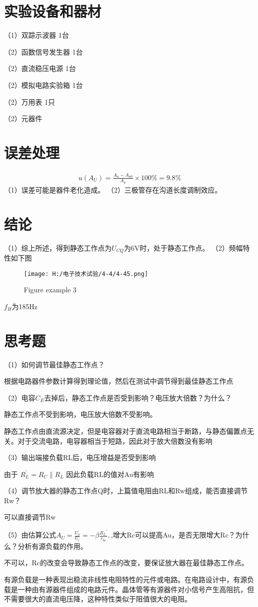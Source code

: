 \documentclass{article}
\begin{document}
	\section{ 实验设备和器材}
	（1）双踪示波器             \qquad \qquad    1台\par
	（2）函数信号发生器          \qquad         1台\par
	（2）直流稳压电源             \qquad \quad  1台\par
	（2）模拟电路实验箱            \qquad  1台\par
	（2）万用表                   \qquad  \qquad \qquad  1只\par
	（2）元器件   
\section{误差处理}

\begin{align*}
	\ u(A_U)=\frac{A_u-A_{u0}}{A_u} \times 100\%=9.8\%
	\end{align*}
（1）误差可能是器件老化造成。
（2）三极管存在沟道长度调制效应。

\section{结论}
（1）综上所述，得到静态工作点为$U_{CQ}$为6V时，处于静态工作点。
（2）频幅特性如下图
\begin{figure}[h]
	\centering
	\texttt{[image: H:/电子技术试验/4-4/4-45.png]}
	\caption{Figure example 3} \label{fig:aa}
\end{figure}
$f_H$为185Hz
\section{思考题}
（1）如何调节最佳静态工作点？\par
根据电路器件参数计算得到理论值，然后在测试中调节得到最佳静态工作点\par
（2）电容$C_E$去掉后，静态工作点是否受到影响？电压放大倍数？为什么？\par
静态工作点不受到影响，电压放大倍数不受影响。\par
静态工作点由直流源决定，但是电容器对于直流电路相当于断路，与静态偏置点无关。对于交流电路，电容器相当于短路，因此对于放大倍数没有影响\par
（3）输出端接负载RL后，电压增益是否受到影响\par
由于 $R_L^{'}=R_C\| R_L$ 因此负载RL的值对Au有影响\par
（4）调节放大器的静态工作点Q时，上篇值电阻由RL和Rw组成，能否直接调节Rw？\par
可以直接调节Rw\par
（5）由估算公式$ A_U=\frac{U_o}{U_i}=-\beta\frac{{R_L}^{'}}{r_{be}},$,增大Rc可以提高Au，是否无限增大Rc？为什么？分析有源负载的作用。\par
不可以，Rc的改变会导致静态工作点的改变，要保证放大器在最佳静态工作点。\par
有源负载是一种表现出稳流非线性电阻特性的元件或电路。在电路设计中，有源负载是一种由有源器件组成的电路元件。晶体管等有源器件对小信号产生高阻抗，但不需要很大的直流电压降，这种特性类似于阻值很大的电阻。\par
\end{document}
